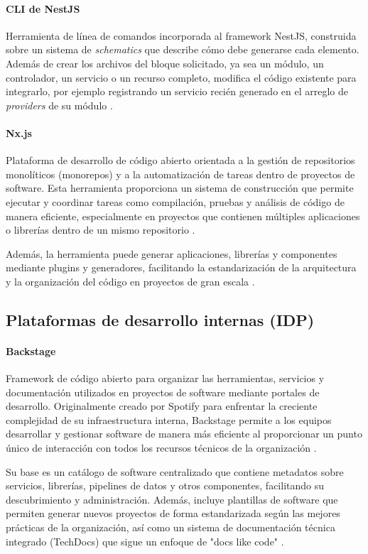 \paragraph*{CLI de NestJS}
Herramienta de línea de comandos incorporada al framework NestJS, construida sobre un sistema de \emph{schematics} que describe cómo debe generarse cada elemento. Además de crear los archivos del bloque solicitado, ya sea un módulo, un controlador, un servicio o un recurso completo, modifica el código existente para integrarlo, por ejemplo registrando un servicio recién generado en el arreglo de \emph{providers} de su módulo \citep{nestjs-2026}.
\paragraph*{Nx.js}
Plataforma de desarrollo de código abierto orientada a la gestión de repositorios monolíticos (monorepos) y a la automatización de tareas dentro de proyectos de software. Esta herramienta proporciona un sistema de construcción que permite ejecutar y coordinar tareas como compilación, pruebas y análisis de código de manera eficiente, especialmente en proyectos que contienen múltiples aplicaciones o librerías dentro de un mismo repositorio \citep{nx-2026}.

Además, la herramienta puede generar aplicaciones, librerías y componentes mediante plugins y generadores, facilitando la estandarización de la arquitectura y la organización del código en proyectos de gran escala \citep{nx-2026}.

\subsection{Plataformas de desarrollo internas (IDP)}
\paragraph*{Backstage}
Framework de código abierto para organizar las herramientas, servicios y documentación utilizados en proyectos de software mediante portales de desarrollo. Originalmente creado por Spotify para enfrentar la creciente complejidad de su infraestructura interna, Backstage permite a los equipos desarrollar y gestionar software de manera más eficiente al proporcionar un punto único de interacción con todos los recursos técnicos de la organización \citep{backstage-2026}.

Su base es un catálogo de software centralizado que contiene metadatos sobre servicios, librerías, pipelines de datos y otros componentes, facilitando su descubrimiento y administración. Además, incluye plantillas de software que permiten generar nuevos proyectos de forma estandarizada según las mejores prácticas de la organización, así como un sistema de documentación técnica integrado (TechDocs) que sigue un enfoque de "docs like code" \citep{backstage-2026}.

